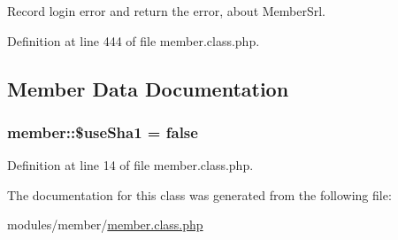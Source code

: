 Record login error and return the error, about Member\+Srl. 



Definition at line 444 of file member.\+class.\+php.



\subsection{Member Data Documentation}
\subsubsection[{\texorpdfstring{\$use\+Sha1}{$useSha1}}]{\setlength{\rightskip}{0pt plus 5cm}member\+::\$use\+Sha1 = false}\hypertarget{classmember_ac0b029db59512728210f8b61dbab59f7}{}\label{classmember_ac0b029db59512728210f8b61dbab59f7}


Definition at line 14 of file member.\+class.\+php.



The documentation for this class was generated from the following file\+:\begin{DoxyCompactItemize}
\item 
modules/member/\hyperlink{member_8class_8php}{member.\+class.\+php}\end{DoxyCompactItemize}
